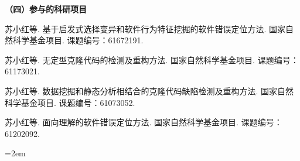 \noindent\textbf{（四）参与的科研项目}
\begin{publist}

\item	
苏小红等. 基于启发式选择变异和软件行为特征挖掘的软件错误定位方法. 国家自然科学基金项目. 课题编号：61672191.
\item	
苏小红等. 无定型克隆代码的检测及重构方法. 国家自然科学基金项目. 课题编号：61173021.
\item
苏小红等. 数据挖掘和静态分析相结合的克隆代码缺陷检测及重构方法. 国家自然科学基金项目. 课题编号：61073052.
\item
苏小红等. 面向理解的软件错误定位方法. 国家自然科学基金项目. 课题编号：61202092.

\end{publist}
\vfill
{}\hangindent=2em\noindent

\setlength{\parindent}{2em}
